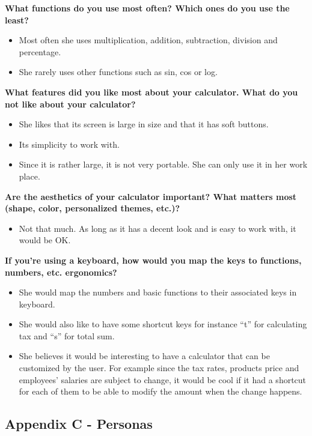 \documentclass[a4paper]{article}
\begin{document}
\textbf{What functions do you use most often? Which ones do you use the least?}
\begin{itemize}
\itemsep0em 
\item Most often she uses multiplication, addition, subtraction, division and percentage. 
\item She rarely uses other functions such as sin, cos or log.
\end{itemize}

\textbf{What features did you like most about your calculator. What do you not like about your calculator?}
\begin{itemize}
\itemsep0em 
\item She likes that its screen is large in size and that it has soft buttons.
\item Its simplicity to work with. 
\item Since it is rather large, it is not very portable. She can only use it in her work place.
\end{itemize}

\textbf{Are the aesthetics of your calculator important? What matters most (shape, color,  personalized themes, etc.)?}
\begin{itemize}
\itemsep0em 
\item Not that much. As long as it has a decent look and is easy to work with, it would be OK.
\end{itemize}

\textbf{If you’re using a keyboard, how would you map the keys to functions, numbers, etc. ergonomics?}
\begin{itemize}
\itemsep0em 
\item She would map the numbers and basic functions to their associated keys in keyboard.
\item She would also like to have some shortcut keys for instance “t” for calculating tax and “s” for total sum.
\item She believes it would be interesting to have a calculator that can be customized by the user. For example since the tax rates, products price and employees' salaries are subject to change, it would be cool if it had a shortcut for each of them to be able to modify the amount when the change happens. 
\end{itemize}
\pagebreak

\subsection{Appendix C - Personas}
\end{document}
